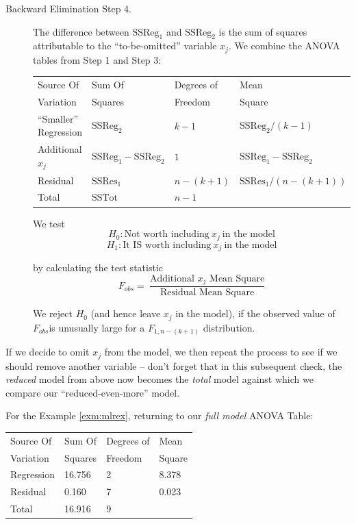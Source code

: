 \documentclass[12pt,a4paper,openany,twoside]{report}
\renewcommand{\emph}[1]{\textcolor{Emerald}{\textit{#1}}}
\theoremstyle{definition}
\theoremstyle{remark}
\theoremstyle{plain}
\newcommand{\vsps}{\vspace{.5cm}}
\theoremstyle{definition}
\theoremstyle{definition}
\theoremstyle{definition}
\theoremstyle{remark}
\begin{document}
\begin{description}
\item[Backward Elimination Step 4.]  The difference between \(\text{SSReg}_{1}\) and \(\text{SSReg}_{2}\) is
the sum of squares attributable to the ``to-be-omitted'' variable
\(x_{j}\).
We combine the ANOVA tables from Step 1 and Step 3:\newline

\begin{longtable}[c]{@{}llll@{}}
\toprule
Source Of & Sum Of & Degrees of & Mean \\
Variation & Squares & Freedom & Square
\tabularnewline
\midrule
\endhead
``Smaller'' Regression & \(\text{SSReg}_{2}\) & \(k-1\) &
\(\text{SSReg}_{2}/(k - 1)\)\tabularnewline
Additional \(x_{j}\) & \(\text{SSReg}_{1} - \text{SSReg}_{2}\) & $1$ &
\(\text{SSReg}_{1} - \text{SSReg}_{2}\)\tabularnewline
Residual & \(\text{SSRes}_{1}\) & \(n - (k + 1)\) &
\(\text{SSRes}_{1}/(n - \left( k + 1 \right))\)\tabularnewline
Total & \(\text{SSTot}\) & \(n - 1\) &\tabularnewline
\bottomrule
\end{longtable}
\vsps

We test
\[H_{0}: \text{Not worth including} \ x_{j}\ \text{in the model}\]
\[H_{1}: \text{It IS worth including} \ x_{j}\ \text{in the model}\]

by calculating the test statistic
\[F_{obs} = \ \frac{\text{Additional\ }x_{j}\text{\ Mean\ Square}}{\text{Residual\ Mean\ Square}}\]

We reject \(H_{0}\) (and hence leave \(x_{j}\) in the model), if the
observed value of \(F_{obs}\)is unusually large for a \(F_{1,n - (k + 1)}\)
distribution.
\end{description}

If we decide to omit \(x_{j}\) from the model, we then repeat the
process to see if we should remove another variable -- don't forget that
in this subsequent check, the \emph{reduced} model from above now becomes the
\emph{total} model against which we compare our ``reduced-even-more'' model.

For the Example \ref{exm:mlrex}, returning to our \emph{full model} ANOVA Table:\newline

\begin{longtable}[c]{@{}llll@{}}
\toprule
Source Of & Sum Of & Degrees of & Mean \\
Variation & Squares & Freedom & Square
\tabularnewline
\midrule
\endhead
Regression & 16.756 & 2 & 8.378 \\
Residual & 0.160 & 7 & 0.023
\tabularnewline
Total & 16.916 & 9 & 
\tabularnewline
\bottomrule
\end{longtable}
\vsps
\end{document}
